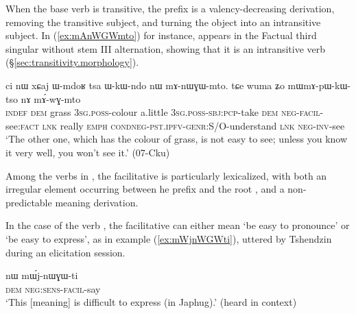 When the base verb is transitive, the  prefix is a valency-decreasing derivation, removing the transitive subject, and turning the object into an intransitive subject. In (\ref{ex:mAnWGWmto}) for instance,  appears in the Factual third singular without stem III alternation, showing that it is an intransitive verb (§\ref{sec:transitivity.morphology}).

\begin{exe}
\ex \label{ex:mAnWGWmto}
\gll ci nɯ xɕaj ɯ-mdoʁ tsa ɯ-kɯ-ndo nɯ mɤ-nɯɣɯ-mto. tɕe wuma ʑo mɯ\redp{}mɤ-pɯ-kɯ-tso nɤ mɤ́-wɣ-mto \\
\textsc{indef} \textsc{dem} grass \textsc{3sg}.\textsc{poss}-colour a.little \textsc{3sg}.\textsc{poss}-\textsc{sbj}:\textsc{pcp}-take \textsc{dem} \textsc{neg}-\textsc{facil}-see:\textsc{fact} \textsc{lnk} really \textsc{emph} \textsc{cond\redp}{}\textsc{neg}-\textsc{pst}.\textsc{ipfv}-\textsc{genr}:S/O-understand \textsc{lnk} \textsc{neg}-\textsc{inv}-see \\
\glt `The other one, which has the colour of grass, is not easy to see; unless you know it very well, you won't see it.' (07-Cku) 
\end{exe}  

Among the verbs in , the facilitative  is particularly lexicalized, with both an irregular  element occurring between he prefix  and the root , and a non-predictable meaning derivation.
 
In the case of the verb , the facilitative  can either mean `be easy to pronounce' or `be easy to express', as in example (\ref{ex:mWjnWGWti}), uttered by Tshendzin during an elicitation session.

\begin{exe}
\ex \label{ex:mWjnWGWti}
\gll  nɯ mɯ́j-nɯɣɯ-ti \\
\textsc{dem} \textsc{neg}:\textsc{sens}-\textsc{facil}-say \\
\glt `This [meaning] is difficult to express (in Japhug).' (heard in context)
\end{exe}  


